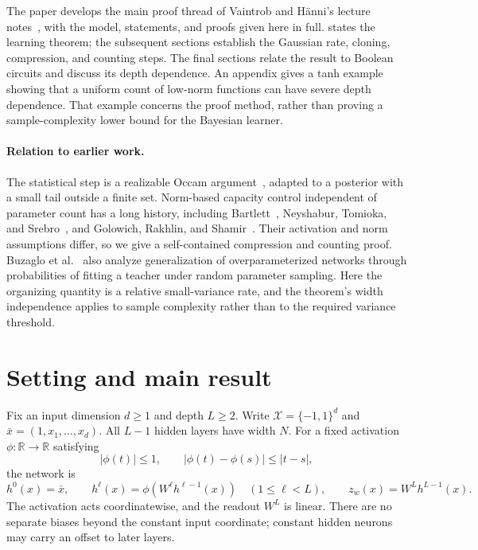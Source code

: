 \documentclass[11pt]{article}
\theoremstyle{definition}
\newcommand{\R}{\mathbb R}
\newcommand{\cX}{\mathcal X}
\begin{document}
The paper develops the main proof thread of Vaintrob and H\"anni's lecture notes~\cite{notes}, with the model, statements, and proofs given here in full.  states the learning theorem; the subsequent sections establish the Gaussian rate, cloning, compression, and counting steps. The final sections relate the result to Boolean circuits and discuss its depth dependence. An appendix gives a tanh example showing that a uniform count of low-norm functions can have severe depth dependence. That example concerns the proof method, rather than proving a sample-complexity lower bound for the Bayesian learner.

\paragraph{Relation to earlier work.}
The statistical step is a realizable Occam argument~\cite{blumer}, adapted to a posterior with a small tail outside a finite set. Norm-based capacity control independent of parameter count has a long history, including Bartlett~\cite{bartlett}, Neyshabur, Tomioka, and Srebro~\cite{neyshabur}, and Golowich, Rakhlin, and Shamir~\cite{golowich}. Their activation and norm assumptions differ, so we give a self-contained compression and counting proof. Buzaglo et al.~\cite{buzaglo} also analyze generalization of overparameterized networks through probabilities of fitting a teacher under random parameter sampling. Here the organizing quantity is a relative small-variance rate, and the theorem's width independence applies to sample complexity rather than to the required variance threshold.

\section{Setting and main result}\label{sec:setting}
Fix an input dimension $d\geq1$ and depth $L\geq2$. Write $\cX=\{-1,1\}^d$ and $\bar x=(1,x_1,\ldots,x_d)$. All $L-1$ hidden layers have width $N$. For a fixed activation $\phi:\R\to\R$ satisfying
\begin{equation}\label{eq:activation}
 |\phi(t)|\leq1,\qquad |\phi(t)-\phi(s)|\leq |t-s|,
\end{equation}
the network is
\[
 h^0(x)=\bar x,\qquad h^\ell(x)=\phi(W^\ell h^{\ell-1}(x))\quad(1\leq\ell<L),
 \qquad z_w(x)=W^Lh^{L-1}(x).
\]
The activation acts coordinatewise, and the readout $W^L$ is linear. There are no separate biases beyond the constant input coordinate; constant hidden neurons may carry an offset to later layers.
\end{document}
